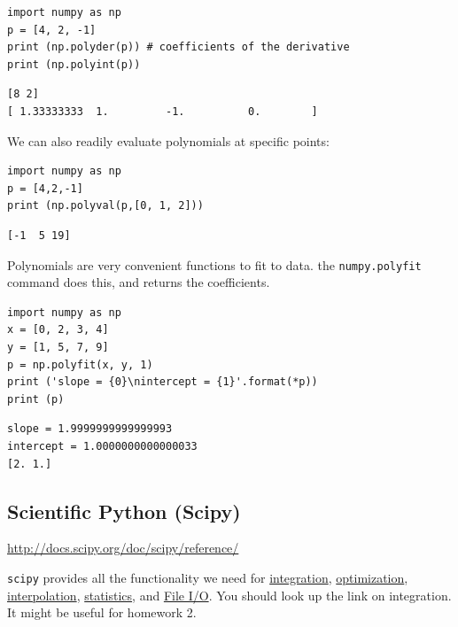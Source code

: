 \documentclass[11pt]{article}
\begin{document}
\begin{verbatim}
import numpy as np
p = [4, 2, -1]
print (np.polyder(p)) # coefficients of the derivative
print (np.polyint(p))
\end{verbatim}

\begin{verbatim}
[8 2]
[ 1.33333333  1.         -1.          0.        ]
\end{verbatim}

We can also readily evaluate polynomials at specific points:
\begin{verbatim}
import numpy as np
p = [4,2,-1]
print (np.polyval(p,[0, 1, 2]))
\end{verbatim}

\begin{verbatim}
[-1  5 19]
\end{verbatim}

Polynomials are very convenient functions to fit to data. the \texttt{numpy.polyfit} command does this, and returns the coefficients.

\begin{verbatim}
import numpy as np
x = [0, 2, 3, 4]
y = [1, 5, 7, 9]
p = np.polyfit(x, y, 1)
print ('slope = {0}\nintercept = {1}'.format(*p))
print (p)
\end{verbatim}

\begin{verbatim}
slope = 1.9999999999999993
intercept = 1.0000000000000033
[2. 1.]
\end{verbatim}


\subsection{Scientific Python (Scipy)}
\label{sec:org68a1623}
\url{http://docs.scipy.org/doc/scipy/reference/}

\texttt{scipy} provides all the functionality we need for \href{http://docs.scipy.org/doc/scipy/reference/tutorial/integrate.html}{integration}, \href{http://docs.scipy.org/doc/scipy/reference/tutorial/optimize.html}{optimization}, \href{http://docs.scipy.org/doc/scipy/reference/tutorial/interpolate.html}{interpolation}, \href{http://docs.scipy.org/doc/scipy/reference/tutorial/stats.html}{statistics}, and \href{http://docs.scipy.org/doc/scipy/reference/tutorial/io.html}{File I/O}. You should look up the link on integration. It might be useful for homework 2.
\end{document}
